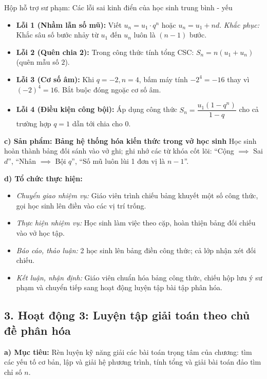 \documentclass[12pt, a4paper]{article}
\begin{document}
\begin{scaffoldbox}{Hộp hỗ trợ sư phạm: Các lỗi sai kinh điển của học sinh trung bình - yếu}
\begin{itemize}[leftmargin=0.6cm]
    \item \textbf{Lỗi 1 (Nhầm lẫn số mũ):} Viết $u_n = u_1 \cdot q^n$ hoặc $u_n = u_1 + nd$. \textit{Khắc phục:} Khắc sâu số bước nhảy từ $u_1$ đến $u_n$ luôn là $(n - 1)$ bước.
    \item \textbf{Lỗi 2 (Quên chia 2):} Trong công thức tính tổng CSC: $S_n = n(u_1 + u_n)$ (quên mẫu số $2$).
    \item \textbf{Lỗi 3 (Cơ số âm):} Khi $q = -2, n = 4$, bấm máy tính $-2^4 = -16$ thay vì $(-2)^4 = 16$. Bắt buộc đóng ngoặc cơ số âm.
    \item \textbf{Lỗi 4 (Điều kiện công bội):} Áp dụng công thức $S_n = \dfrac{u_1(1 - q^n)}{1 - q}$ cho cả trường hợp $q = 1$ dẫn tới chia cho $0$.
\end{itemize}
\end{scaffoldbox}

\noindent \textbf{c) Sản phẩm: Bảng hệ thống hóa kiến thức trong vở học sinh}
Học sinh hoàn thành bảng đối sánh vào vở ghi; ghi nhớ các từ khóa cốt lõi: ``Cộng $\implies$ Sai $d$'', ``Nhân $\implies$ Bội $q$'', ``Số mũ luôn lùi 1 đơn vị là $n-1$''.

\noindent \textbf{d) Tổ chức thực hiện:}
\begin{itemize}[leftmargin=0.8cm]
    \item \textit{Chuyển giao nhiệm vụ:} Giáo viên trình chiếu bảng khuyết một số công thức, gọi học sinh lên điền vào các vị trí trống.
    \item \textit{Thực hiện nhiệm vụ:} Học sinh làm việc theo cặp, hoàn thiện bảng đối chiếu vào vở học tập.
    \item \textit{Báo cáo, thảo luận:} 2 học sinh lên bảng điền công thức; cả lớp nhận xét đối chiếu.
    \item \textit{Kết luận, nhận định:} Giáo viên chuẩn hóa bảng công thức, chiếu hộp lưu ý sư phạm và chuyển tiếp sang hoạt động luyện tập bài tập phân hóa.
\end{itemize}

\subsection*{3. Hoạt động 3: Luyện tập giải toán theo chủ đề phân hóa}

\noindent \textbf{a) Mục tiêu:}
Rèn luyện kỹ năng giải các bài toán trọng tâm của chương: tìm các yếu tố cơ bản, lập và giải hệ phương trình, tính tổng và giải bài toán đảo tìm chỉ số $n$.
\end{document}
